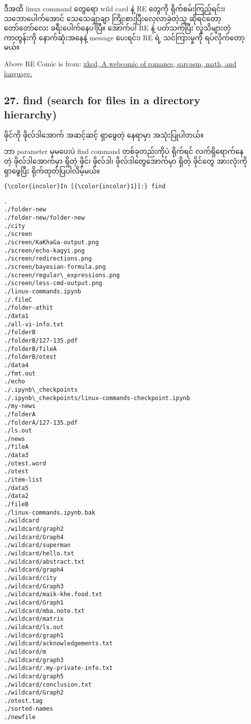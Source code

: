 \documentclass[11pt]{article}
\begin{document}
ဒီအထိ linux command တွေရော wild card နဲ့ RE တွေကို ရိုက်စမ်းကြည့်ရင်း၊
သဘောပေါက်အောင် သေသေချာချာ ကြိုးစားပြီးလေ့လာခဲ့တဲ့သူ ဆိုရင်တော့
တော်တော်လေး ခရီးပေါက်နေပါပြီ။ အောက်ပါ RE နဲ့ ပတ်သက်ပြီး လူသိများတဲ့
ကာတွန်းကို နောက်ဆုံးအနေနဲ့ message ပေးရင်း၊ RE ရဲ့ သင်ကြားမှုကို
ရပ်လိုက်တော့မယ်။

    

    Above RE Comic is from: \href{https://xkcd.com/208/}{xkcd, A webcomic of
romance, sarcasm, math, and language.}

    \subsection{27. find (search for files in a directory
hierarchy)}\label{find-search-for-files-in-a-directory-hierarchy}

ဖိုင်ကို ဖိုလ်ဒါအောက် အဆင့်ဆင့် ရှာဖွေတဲ့ နေရာမှာ အသုံးပြုပါတယ်။

ဘာ parameter မှမပေးပဲ find command တစ်ခုတည်းကိုပဲ ရိုက်ရင်
လက်ရှိရောက်နေတဲ့ ဖိုလ်ဒါအောက်မှာ ရှိတဲ့ ဖိုင်၊ ဖိုလ်ဒါ၊
ဖိုလ်ဒါတွေအောက်မှာ ရှိတဲ့ ဖိုင်တွေ အားလုံးကို ရှာဖွေပြီး
ရိုက်ထုတ်ပြပါလိမ့်မယ်။

    \begin{Verbatim}[commandchars=\\\{\}]
{\color{incolor}In [{\color{incolor}1}]:} find
\end{Verbatim}

    \begin{Verbatim}[commandchars=\\\{\}]
.
./folder-new
./folder-new/folder-new
./city
./screen
./screen/KaKhaGa-output.png
./screen/echo-kagyi.png
./screen/redirections.png
./screen/bayesian-formula.png
./screen/regular\_expressions.png
./screen/less-cmd-output.png
./linux-commands.ipynb
./.fileC
./folder-athit
./data1
./all-vi-info.txt
./folderB
./folderB/127-135.pdf
./folderB/fileA
./folderB/otest
./data4
./fmt.out
./echo
./.ipynb\_checkpoints
./.ipynb\_checkpoints/linux-commands-checkpoint.ipynb
./my-news
./folderA
./folderA/127-135.pdf
./ls.out
./news
./fileA
./data3
./otest.word
./otest
./item-list
./data5
./data2
./fileB
./linux-commands.ipynb.bak
./wildcard
./wildcard/graph2
./wildcard/Graph4
./wildcard/superman
./wildcard/hello.txt
./wildcard/abstract.txt
./wildcard/graph4
./wildcard/city
./wildcard/Graph3
./wildcard/maik-khe.food.txt
./wildcard/Graph1
./wildcard/mba.note.txt
./wildcard/matrix
./wildcard/ls.out
./wildcard/graph1
./wildcard/acknowledgements.txt
./wildcard/m
./wildcard/graph3
./wildcard/.my-private-info.txt
./wildcard/graph5
./wildcard/conclusion.txt
./wildcard/Graph2
./otest.tag
./sorted-names
./newfile

    \end{Verbatim}
\end{document}
